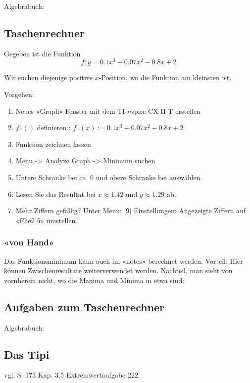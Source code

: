 Algebrabuch:

\newpage


\subsection{Taschenrechner}
Gegeben ist die Funktion
$$f: y = 0.1 x^3 + 0.07 x^2 - 0.8 x + 2$$

Wir suchen diejenige positive $x$-Position, wo die Funktion am kleinsten ist.

Vorgehen:
\begin{enumerate}
\item Neues «Graph» Fenster mit dem TI-$n$spire CX II-T erstellen
\item $f1()$ definieren : $f1(x) := 0.1 x^3 + 0.07 x^2 - 0.8 x + 2$
\item Funktion zeichnen lassen
\item Menu -> Analyze Graph -> Minimum suchen
\item Untere Schranke bei ca. 0 und obere Schranke bei  auswählen.
\item Lesen Sie das Resultat bei $x\approx 1.42$ und $y\approx 1.29$ ab.
  \item Mehr Ziffern gefällig? Unter Menu: [9] Einstellungen: Angezeigte Ziffern auf \zB «Fließ 5» umstellen.
\end{enumerate}


\subsubsection{«von Hand»}
Das Funktionsminimum kann auch im «notes» berechnet werden. Vorteil: Hier können Zwischenresultate weiterverwendet werden. Nachteil, man sieht von vornherein nicht, wo die Maxima und Minima in etwa sind:




\subsection*{Aufgaben zum Taschenrechner}

Algebrabuch:


\newpage
\subsection{Das Tipi}
vgl. \cite{frommenwiler18geom} S. 173 Kap. 3.5 Extremwertaufgabe 222.

